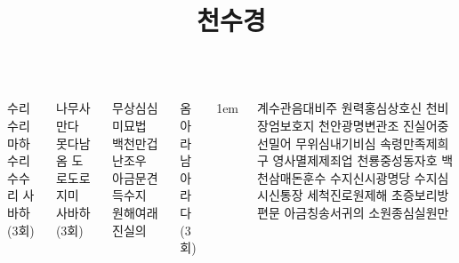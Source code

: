 \documentclass[20pt, a0paper ]{tikzposter}
\title{천수경 }
\begin{document}
	\maketitle

	\begin{columns}


			{
				\begin{LARGE}
					수리수리 마하수리 수수리 사바하 (3회)
				\end{LARGE}
			}


			{
				\begin{LARGE}
					나무사만다 못다남 옴 도로도로지미 사바하  (3회)
				\end{LARGE}
			}

			{
				\begin{LARGE}
				무상심심미묘법 
				백천만겁난조우 				
				아금문견득수지 
				원해여래진실의
				\end{LARGE}
			}



			{
				\begin{LARGE}
				옴 아라남 아라다 (3회)
				\end{LARGE}
			}


			{
					\setlength{\leftmargini}{4em}
					\setlength{\labelsep} {1em}
				\begin{LARGE}

계수관음대비주 원력홍심상호신 
천비장엄보호지 천안광명변관조
진실어중선밀어 무위심내기비심 속령만족제희구 영사멸제제죄업
천룡중성동자호 백천삼매돈훈수 수지신시광명당 수지심시신통장
세척진로원제해 초증보리방편문 아금칭송서귀의 소원종심실원만


\end{LARGE}}
\end{columns}
\end{document}
